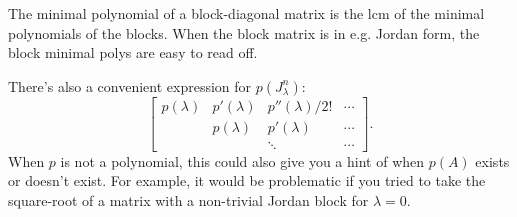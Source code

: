 The minimal polynomial of a block-diagonal matrix is the lcm of the minimal polynomials of the blocks. When the block matrix is in e.g. Jordan form, the block minimal polys are easy to read off.

There's also a convenient expression for $p(J^n_\lambda)$:
\[
	\begin{bmatrix}
	p(\lambda) & p'(\lambda) & p''(\lambda)/2! & \cdots \\
	& p(\lambda) & p'(\lambda) & \cdots \\
	&& \ddots & \cdots
	\end{bmatrix}.
\]
When $p$ is not a polynomial, this could also give you a hint of when $p(A)$ exists or doesn't exist. For example, it would be problematic if you tried to take the square-root of a matrix with a non-trivial Jordan block for $\lambda = 0$.